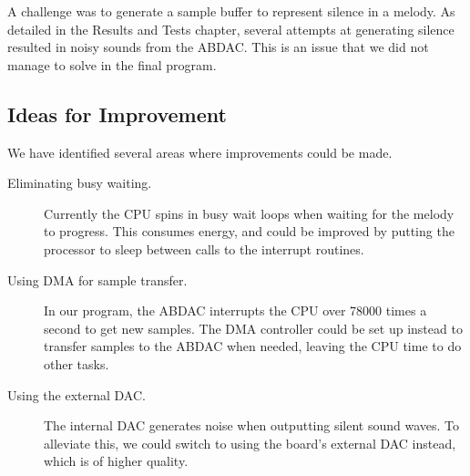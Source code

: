 A challenge was to generate a sample buffer to represent silence in a
melody. As detailed in the Results and Tests chapter, several attempts
at generating silence resulted in noisy sounds from the ABDAC. This is
an issue that we did not manage to solve in the final program.

\subsection{Ideas for Improvement}

We have identified several areas where improvements could be made.

\begin{description}
    \item [Eliminating busy waiting.]
        Currently the CPU spins in busy wait loops when waiting for the
        melody to progress. This consumes energy, and could be improved
        by putting the processor to sleep between calls to the interrupt
        routines.
    \item [Using DMA for sample transfer.]
        In our program, the ABDAC interrupts the CPU over 78000 times a
        second to get new samples. The DMA controller could be set up
        instead to transfer samples to the ABDAC when needed, leaving
        the CPU time to do other tasks.
    \item [Using the external DAC.]
        The internal DAC generates noise when outputting silent sound
        waves. To alleviate this, we could switch to using the board's
        external DAC instead, which is of higher quality. \cite{comp}
\end{description}
